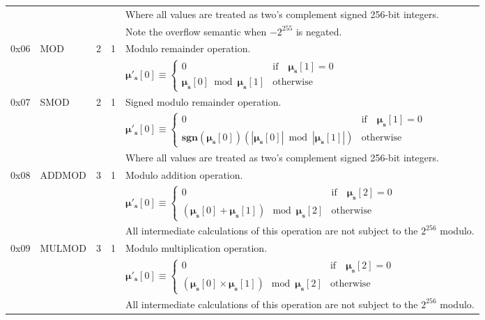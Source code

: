 \documentclass[9pt,oneside]{amsart}
\begin{document}
\begin{tabular*}{\columnwidth}[h]{rlrrl}
&&&& Where all values are treated as two's complement signed 256-bit integers. \\
&&&& Note the overflow semantic when $-2^{255}$ is negated.\\
\midrule
0x06 & {\small MOD} & 2 & 1 & Modulo remainder operation. \\
&&&& $\boldsymbol{\mu}'_\mathbf{s}[0] \equiv \begin{cases}0 & \text{if} \quad \boldsymbol{\mu}_\mathbf{s}[1] = 0\\ \boldsymbol{\mu}_\mathbf{s}[0] \bmod \boldsymbol{\mu}_\mathbf{s}[1] & \text{otherwise}\end{cases}$  \\
\midrule
0x07 & {\small SMOD} & 2 & 1 & Signed modulo remainder operation. \\
&&&& $\boldsymbol{\mu}'_\mathbf{s}[0] \equiv \begin{cases}0 & \text{if} \quad \boldsymbol{\mu}_\mathbf{s}[1] = 0\\ \mathbf{sgn} (\boldsymbol{\mu}_\mathbf{s}[0]) (|\boldsymbol{\mu}_\mathbf{s}[0]| \bmod |\boldsymbol{\mu}_\mathbf{s}[1]|) & \text{otherwise}\end{cases}$  \\
&&&& Where all values are treated as two's complement signed 256-bit integers. \\
\midrule
0x08 & {\small ADDMOD} & 3 & 1 & Modulo addition operation. \\
&&&& $\boldsymbol{\mu}'_\mathbf{s}[0] \equiv \begin{cases}0 & \text{if} \quad \boldsymbol{\mu}_\mathbf{s}[2] = 0\\ (\boldsymbol{\mu}_\mathbf{s}[0] + \boldsymbol{\mu}_\mathbf{s}[1]) \mod \boldsymbol{\mu}_\mathbf{s}[2] & \text{otherwise}\end{cases}$  \\
&&&& All intermediate calculations of this operation are not subject to the $2^{256}$ modulo. \\
\midrule
0x09 & {\small MULMOD} & 3 & 1 & Modulo multiplication operation. \\
&&&& $\boldsymbol{\mu}'_\mathbf{s}[0] \equiv \begin{cases}0 & \text{if} \quad \boldsymbol{\mu}_\mathbf{s}[2] = 0\\ (\boldsymbol{\mu}_\mathbf{s}[0] \times \boldsymbol{\mu}_\mathbf{s}[1]) \mod \boldsymbol{\mu}_\mathbf{s}[2] & \text{otherwise}\end{cases}$  \\
&&&& All intermediate calculations of this operation are not subject to the $2^{256}$ modulo. \\

\end{tabular*}
\end{document}
